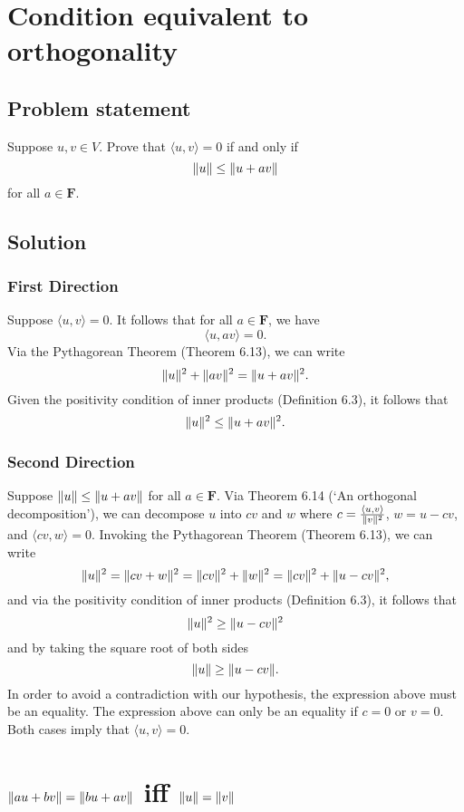\documentclass{article}
\begin{document}
\clearpage

\section{Condition equivalent to orthogonality}
\subsection*{Problem statement}
Suppose $u,v\in V$. 
Prove that $\langle u,v\rangle=0$ if and only if
\[\lVert u\rVert\leq\lVert u+av\rVert\]
for all $a\in\mathbf{F}$.

\subsection*{Solution}
\subsubsection*{First Direction}
Suppose $\langle u,v\rangle=0$. 
It follows that for all $a\in\mathbf{F}$, we have
\[\langle u,av\rangle=0.\]
Via the Pythagorean Theorem (Theorem 6.13), we can write
\[\lVert u\rVert^2+\lVert av\rVert^2=\lVert u+av\rVert^2.\]
Given the positivity condition of inner products (Definition 6.3), it follows that
\[\lVert u\rVert^2\leq\lVert u+av\rVert^2.\]

\subsubsection*{Second Direction}
Suppose $\lVert u\rVert\leq\lVert u+av\rVert$ for all $a\in\mathbf{F}$. 
Via Theorem 6.14 (`An orthogonal decomposition'), we can decompose $u$ into $cv$ and $w$ where $c=\frac{\langle u,v\rangle}{\lVert v\rVert^2}$, $w=u-cv$, and $\langle cv,w\rangle=0$. 
Invoking the Pythagorean Theorem (Theorem 6.13), we can write
\[\lVert u\rVert^2=\lVert cv+w\rVert^2=\lVert cv\rVert^2+\lVert w\rVert^2=\lVert cv\rVert^2+\lVert u-cv\rVert^2,\]
and via the positivity condition of inner products (Definition 6.3), it follows that
\[\lVert u\rVert^2\geq\lVert u-cv\rVert^2\]
and by taking the square root of both sides
\[\lVert u\rVert\geq\lVert u-cv\rVert.\]
In order to avoid a contradiction with our hypothesis, the expression above must be an equality. 
The expression above can only be an equality if $c=0$ or $v=0$. 
Both cases imply that $\langle u,v\rangle=0$.

\clearpage

\section{$\lVert au+bv\rVert=\lVert bu+av\rVert$ iff $\lVert u\rVert=\lVert v\rVert$}
\end{document}
